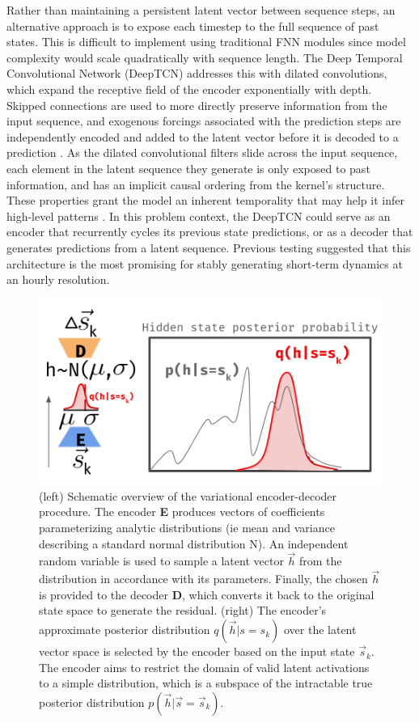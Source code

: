 \documentclass[11pt]{article}
\begin{document}
\begin{multicols}{2}
    Rather than maintaining a persistent latent vector between sequence steps, an alternative approach is to expose each timestep to the full sequence of past states. This is difficult to implement using traditional FNN modules since model complexity would scale quadratically with sequence length. The Deep Temporal Convolutional Network (DeepTCN) addresses this with dilated convolutions, which expand the receptive field of the encoder exponentially with depth. Skipped connections are used to more directly preserve information from the input sequence, and exogenous forcings associated with the prediction steps are independently encoded and added to the latent vector before it is decoded to a prediction \cite{chen_probabilistic_2020}. As the dilated convolutional filters slide across the input sequence, each element in the latent sequence they generate is only exposed to past information, and has an implicit causal ordering from the kernel's structure. These properties grant the model an inherent temporality that may help it infer high-level patterns \cite{oord_wavenet_2016}. In this problem context, the DeepTCN could serve as an encoder that recurrently cycles its previous state predictions, or as a decoder that generates predictions from a latent sequence. Previous testing suggested that this architecture is the most promising for stably generating short-term dynamics at an hourly resolution.

    \begin{figure}[H]
        \centering

        \includegraphics[width=.95\linewidth]{figs/ved.png}

        \caption{(left) Schematic overview of the variational encoder-decoder procedure. The encoder \textbf{E} produces vectors of coefficients parameterizing analytic distributions (ie mean and variance describing a standard normal distribution N). An independent random variable is used to sample a latent vector $\vec{h}$ from the distribution in accordance with its parameters. Finally, the chosen $\vec{h}$ is provided to the decoder \textbf{D}, which converts it back to the original state space to generate the residual. (right) The encoder's approximate posterior distribution $q(\vec{h}|s=s_k)$ over the latent vector space is selected by the encoder based on the input state $\vec{s}_k$. The encoder aims to restrict the domain of valid latent activations to a simple distribution, which is a subspace of the intractable true posterior distribution $p(\vec{h}|\vec{s}=\vec{s}_k)$.}
        \label{ved}
    \end{figure}


\end{multicols}
\end{document}
